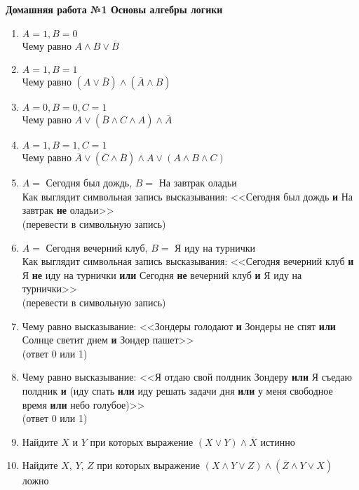 



    \begin{center}
        \textbf{Домашняя работа №1 Основы алгебры логики}
    \end{center}

    \begin{enumerate}
        \item $A = 1, B = 0$\\
        Чему равно $A \wedge B \vee \overline B$

        \item $A = 1, B = 1$\\
        Чему равно $(A \vee \overline B) \wedge (\overline A \wedge B)$

        \item $A = 0, B = 0, C = 1$\\
        Чему равно $A \vee (\overline B \wedge C \wedge A) \wedge \overline A$

        \item $A = 1, B = 1, C = 1$\\
        Чему равно $\overline A \vee (\overline C \wedge \overline B) \wedge A \vee (A \wedge B \wedge C)$

        \item $A = $ Сегодня был дождь, $B = $ На завтрак оладьи\\
        Как выглядит символьная запись высказывания: <<Сегодня был дождь \textbf{и} На завтрак \textbf{не} оладьи>>\\
        (перевести в символьную запись)

        \item $A = $ Сегодня вечерний клуб, $B = $ Я иду на турнички\\
        Как выглядит символьная запись высказывания: <<Сегодня вечерний клуб \textbf{и} Я \textbf{не} иду на турнички \textbf{или} Сегодня \textbf{не} вечерний клуб \textbf{и} Я иду на турнички>>\\
        (перевести в символьную запись)

        \item Чему равно высказывание: <<Зондеры голодают \textbf{и} Зондеры не спят \textbf{или} Солнце светит днем \textbf{и} {Зондер пашет}>>\\
        (ответ 0 или 1)

        \item Чему равно высказывание: <<Я отдаю свой полдник Зондеру \textbf{или} Я съедаю полдник \textbf{и} (иду спать \textbf{или} иду решать задачи дня \textbf{или} у меня свободное время \textbf{или} небо голубое)>>\\
        (ответ 0 или 1)

        \item Найдите $X$ и $Y$ при которых выражение $(X \vee Y) \wedge \overline X$ истинно

        \item Найдите $X$, $Y$, $Z$ при которых выражение $(X \wedge Y \vee Z) \wedge(\overline Z \wedge Y \vee X)$ ложно
    \end{enumerate}


